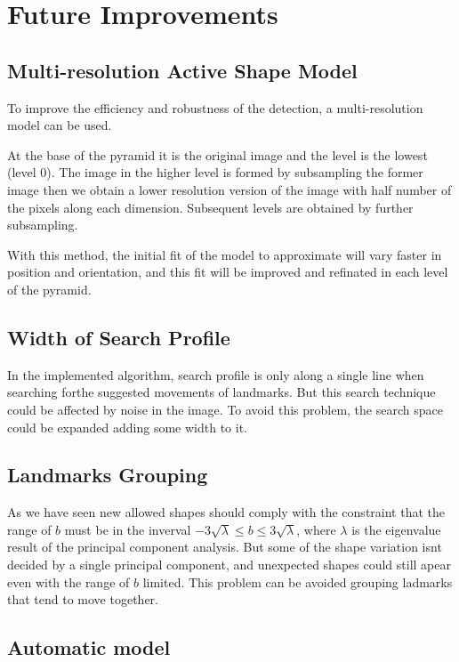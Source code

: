 \section{Future Improvements}

\subsection{Multi-resolution Active Shape Model}
To improve the efficiency and robustness of the detection, a
multi-resolution model can be used.

At the base of the pyramid it is the original image and
the level is the lowest (level 0). The image in the higher
level is formed by subsampling the former image then we obtain
a lower resolution version of the image with half number of
the pixels along each dimension. Subsequent levels are
obtained by further subsampling.

With this method, the initial fit of the model to approximate
will vary faster in position and orientation, and this fit will be
improved and refinated in each level of the pyramid.

\subsection{Width of Search Profile}
In the implemented algorithm, search profile is only
along a single line when searching forthe suggested
movements of landmarks. But this search technique could
be affected by noise in the image. To avoid this problem,
the search space could be expanded adding some width to it. 

\subsection{Landmarks Grouping}
As we have seen new allowed shapes should comply with
the constraint that the range of $b$ must be in the inverval
$-3\sqrt\lambda \leq b \leq 3\sqrt\lambda$, where $\lambda$ is the
eigenvalue result of the principal component analysis. But some of
the shape variation isnt decided by a single principal component, and
unexpected shapes could still apear even with the range of $b$ limited.
This problem can be avoided grouping ladmarks that tend to move together.

\subsection{Automatic model}

